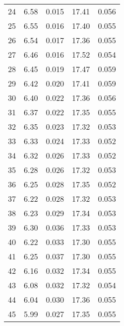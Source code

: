 \begin{table}
\begin{tabular}{c|ll|ll}
24 & 6.58 & 0.015 & 17.41 & 0.056 \\
25 & 6.55 & 0.016 & 17.40 & 0.055 \\
26 & 6.54 & 0.017 & 17.36 & 0.055 \\
27 & 6.46 & 0.016 & 17.52 & 0.054 \\
28 & 6.45 & 0.019 & 17.47 & 0.059 \\
29 & 6.42 & 0.020 & 17.41 & 0.059 \\
30 & 6.40 & 0.022 & 17.36 & 0.056 \\
31 & 6.37 & 0.022 & 17.35 & 0.055 \\
32 & 6.35 & 0.023 & 17.32 & 0.053 \\
33 & 6.33 & 0.024 & 17.33 & 0.052 \\
34 & 6.32 & 0.026 & 17.33 & 0.052 \\
35 & 6.28 & 0.026 & 17.32 & 0.053 \\
36 & 6.25 & 0.028 & 17.35 & 0.052 \\
37 & 6.22 & 0.028 & 17.32 & 0.053 \\
38 & 6.23 & 0.029 & 17.34 & 0.053 \\
39 & 6.30 & 0.036 & 17.33 & 0.053 \\
40 & 6.22 & 0.033 & 17.30 & 0.055 \\
41 & 6.25 & 0.037 & 17.30 & 0.055 \\
42 & 6.16 & 0.032 & 17.34 & 0.055 \\
43 & 6.08 & 0.032 & 17.32 & 0.054 \\
44 & 6.04 & 0.030 & 17.36 & 0.055 \\
45 & 5.99 & 0.027 & 17.35 & 0.055 \\
               \hline
        \end{tabular}
    \end{table}
    \clearpage


